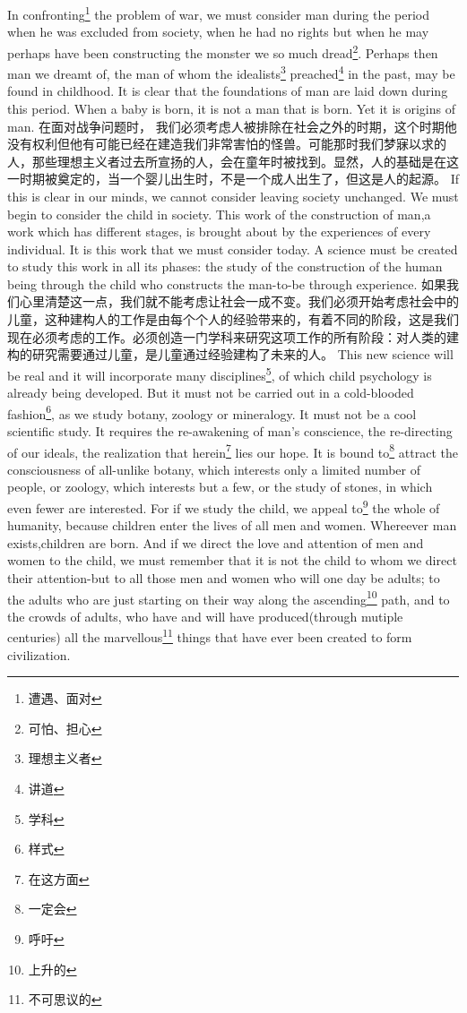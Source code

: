 \documentclass[lang=cn,10pt]{elegantbook}
\begin{document}
In confronting\footnote{遭遇、面对} the problem of war, we must consider man during the period when he was excluded from society, when he had no rights but when he may perhaps have been constructing the monster we so much dread\footnote{可怕、担心}. Perhaps then man we dreamt of, the man of whom the idealists\footnote{理想主义者} preached\footnote{讲道} in the past, may be found in childhood. It is clear that the foundations of man are laid down during this period. When a baby is born, it is not a man that is born. Yet it is origins of man.
在面对战争问题时， 我们必须考虑人被排除在社会之外的时期，这个时期他没有权利但他有可能已经在建造我们非常害怕的怪兽。可能那时我们梦寐以求的人，那些理想主义者过去所宣扬的人，会在童年时被找到。显然，人的基础是在这一时期被奠定的，当一个婴儿出生时，不是一个成人出生了，但这是人的起源。
If this is clear in our minds, we cannot consider leaving society unchanged. We must begin to consider the child in society. This work of the construction of man,a work which has different stages, is brought about by the experiences of every individual. It is this work that we must consider today. A science must be created to study this work in all its phases: the study of the construction of the human being through the child who constructs the man-to-be through experience.
如果我们心里清楚这一点，我们就不能考虑让社会一成不变。我们必须开始考虑社会中的儿童，这种建构人的工作是由每个个人的经验带来的，有着不同的阶段，这是我们现在必须考虑的工作。必须创造一门学科来研究这项工作的所有阶段：对人类的建构的研究需要通过儿童，是儿童通过经验建构了未来的人。
This new science will be real and it will incorporate many disciplines\footnote{学科}, of which child psychology is already being developed. But it must not be carried out in a cold-blooded fashion\footnote{样式}, as we study botany, zoology or mineralogy. It must not be a cool scientific study. It requires the re-awakening of man's conscience, the re-directing of our ideals, the realization that herein\footnote{在这方面} lies our hope. It is bound to\footnote{一定会} attract the consciousness of all-unlike botany, which interests only a limited number of people, or zoology, which interests but a few, or the study of stones, in which even fewer are interested. For if we study the child, we appeal to\footnote{呼吁} the whole of humanity, because children enter the lives of all men and women. Whereever man exists,children are born. And if we direct the love and attention of men and women to the child, we must remember that it is not the child to whom we direct their attention-but to all those men and women who will one day be adults; to the adults who are just starting on their way along the ascending\footnote{上升的} path, and to the crowds of adults, who have and will have produced(through mutiple centuries) all the marvellous\footnote{不可思议的} things that have ever been created to form civilization.
\end{document}
